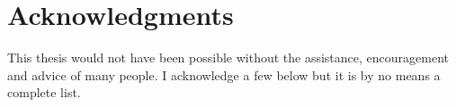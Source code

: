 \maketitle



\cleardoublepage
\setcounter{savepage}{\thepage}
\begin{abstractpage}

\end{abstractpage}

% 

\cleardoublepage

\section*{Acknowledgments}
This thesis would not have been possible without the assistance, encouragement and advice of many people.  I acknowledge a few below but it is by no means a complete list.
 
